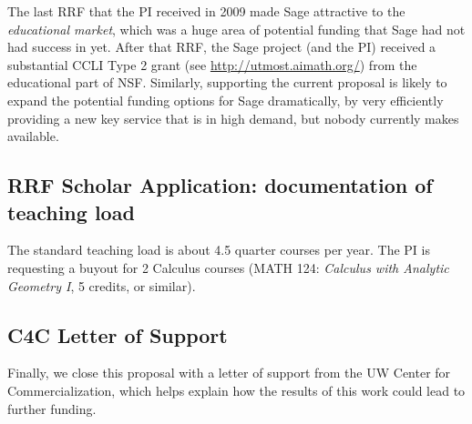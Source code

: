 \documentclass[11pt]{article}
\begin{document}
The last RRF that the PI received in 2009 made Sage attractive to the
{\em educational market}, which was a huge area of potential funding
that Sage had not had success in yet.  After that RRF, the Sage
project (and the PI) received a substantial CCLI Type 2 grant (see
\url{http://utmost.aimath.org/}) from the educational part of NSF.
Similarly, supporting the current proposal is likely to expand the
potential funding options for Sage dramatically, by very efficiently
providing a new key service that is in high demand, but nobody
currently makes available.

\subsection{RRF Scholar Application: documentation of teaching load}
The standard teaching load is about 4.5 quarter courses per year.  The
PI is requesting a buyout for 2 Calculus courses (MATH 124: {\em
  Calculus with Analytic Geometry I}, 5 credits, or similar). 

\subsection{C4C Letter of Support}\label{sec:letter}
Finally, we close this proposal with a letter of support from the UW
Center for Commercialization, which helps explain how the results of
this work could lead to further funding.


\end{document}
